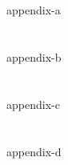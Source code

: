 \documentclass[11pt]{article} %
\begin{document}

\ifdefined\MyAppendixA
  \clearpage %
  \section*{\MyAppendixA}
  \label{appendixA}
  \singlespacing
  {appendix-a}
\fi

\clearpage

\ifdefined\MyAppendixB
  \clearpage %
  \section*{\MyAppendixB}
  \label{appendixB}
  \doublespacing
  {appendix-b}
\fi

\clearpage

\ifdefined\MyAppendixC
  \clearpage %
  \section*{\MyAppendixC}
  \label{appendixC}
  \singlespacing
  {appendix-c}
\fi
\clearpage

\ifdefined\MyAppendixD
  \clearpage %
  \section*{\MyAppendixD}
  \label{appendixD}
  \singlespacing
  {appendix-d}
\fi
\clearpage

\end{document}
